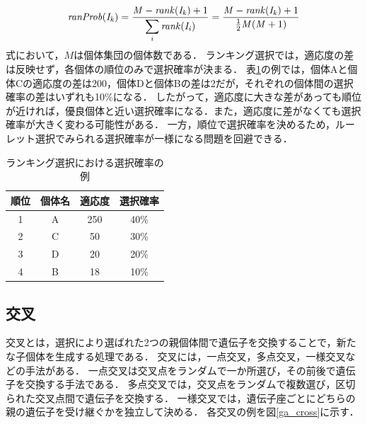     \begin{equation}\label{eq0302}
        {\it ranProb}({\it I_k}) = \frac{{\it M} - {\it rank}({\it I_k}) + 1} {\displaystyle\sum_i{{\it rank}({\it I_i})}} = \frac{{\it M} - {\it rank}({\it I_k}) + 1}{\frac{1}{2}{\it M}({\it M}+1)}
    \end{equation}
式において，$M$は個体集団の個体数である．
ランキング選択では，適応度の差は反映せず，各個体の順位のみで選択確率が決まる．
表\ref{rank}の例では，個体Aと個体Cの適応度の差は200，個体Dと個体Bの差は2だが，それぞれの個体間の選択確率の差はいずれも10\%になる．
したがって，適応度に大きな差があっても順位が近ければ，優良個体と近い選択確率になる．また，適応度に差がなくても選択確率が大きく変わる可能性がある．
一方，順位で選択確率を決めるため，ルーレット選択でみられる選択確率が一様になる問題を回避できる．

\begin{table}[t]
	\centering
	\caption{ランキング選択における選択確率の例}
	\begin{tabular}{|c|c|c|c|} \hline
	順位   & 個体名 & 適応度 & 選択確率 \\ \hline
	1      & A & 250 & 40\% \\ \hline
	2      & C & 50 & 30\% \\ \hline
	3      & D & 20 & 20\% \\ \hline 
	4      & B & 18 & 10\% \\ \hline 
	\end{tabular}
	\label{rank}
\end{table}



\subsection{交叉}
交叉とは，選択により選ばれた2つの親個体間で遺伝子を交換することで，新たな子個体を生成する処理である．
交叉には，一点交叉，多点交叉，一様交叉などの手法がある．
一点交叉は交叉点をランダムで一か所選び，その前後で遺伝子を交換する手法である．
多点交叉では，交叉点をランダムで複数選び，区切られた交叉点間で遺伝子を交換する．
一様交叉では，遺伝子座ごとにどちらの親の遺伝子を受け継ぐかを独立して決める．
各交叉の例を図\ref{ga_cross}に示す．

